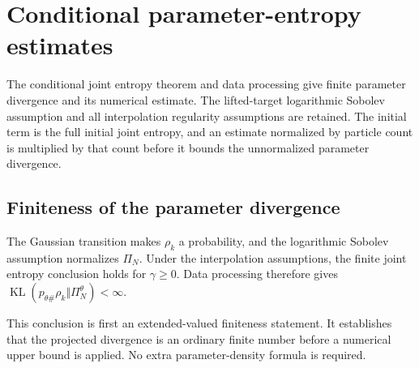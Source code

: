 \documentclass[11pt,a4paper]{report}
\begin{document}
\section{\texorpdfstring{Conditional parameter-entropy estimates}{Conditional parameter-entropy estimates}}
\label{proof-module-IPLA-LSI-Corollaries-lean}


The conditional joint entropy theorem and data processing give finite parameter divergence and its numerical estimate. The lifted-target logarithmic Sobolev assumption and all interpolation regularity assumptions are retained. The initial term is the full initial joint entropy, and an estimate normalized by particle count is multiplied by that count before it bounds the unnormalized parameter divergence.

\subsection{\texorpdfstring{Finiteness of the parameter divergence}{Finiteness of the parameter divergence}}
\label{report-step-IPLA-LSI-Corollaries-lean-1}


The Gaussian transition makes \(\rho_k\) a probability, and the logarithmic Sobolev assumption normalizes \(\Pi_N\). Under the interpolation assumptions, the finite joint entropy conclusion holds for \(\gamma\ge0\). Data processing therefore gives \(\operatorname{KL}(p_{\theta\#}\rho_k\Vert\Pi_N^\theta)<\infty\).



This conclusion is first an extended-valued finiteness statement. It establishes that the projected divergence is an ordinary finite number before a numerical upper bound is applied. No extra parameter-density formula is required.
\end{document}
